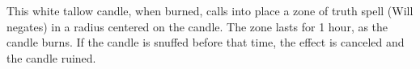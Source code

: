 {\begin{comment}
Faint abjuration; CL 1st; Craft Wondrous Item, shield; Price 1,500 gp.

Broom of Flying:} This broom is able to fly through the air as if affected by an overland flight spell (average maneuverability) for up to 9 hours per day (split up as its owner desires). The broom can carry 200 pounds and fly at a speed of 40 feet, or up to 400 pounds at a speed at 30 feet. In addition, the broom can travel alone to any destination named by the owner as long as she has a good idea of the location and layout of that destination. It comes to its owner from as far away as 300 yards when she speaks the command word. The broom of flying has a speed of 40 feet when it has no rider.

Moderate transmutation; CL 9th; Craft Wondrous Item, overland flight, permanency; Price 17,000 gp;Weight 3 lb.

Candle of Invocation:} Each of these special tapers is dedicated to one of the nine alignments. Simply burning the candle generates a favorable aura for the individual so doing if the candle's alignment matches that of the character. Characters of the same alignment as the burning candle add a \plus2 morale bonus on attack rolls, saving throws, and skill checks while within 30 feet of the flame.

A cleric whose alignment matches the candle's operates as if two levels higher for purposes of determining spells per day if he burns the candle during or just prior to his spell preparation time. He can even cast spells normally unavailable to him, as if he were of that higher level, but only so long as the candle continues to burn. Except in special cases (see below), a candle burns for 4 hours.

In addition, burning a candle also allows the owner to cast a gate spell, the respondent being of the same alignment as the candle, but the taper is immediately consumed in the process. It is possible to extinguish the candle simply by blowing it out, so users often place it in a lantern to protect it from drafts and the like. Doing this doesn't interfere with its magical properties.

Strong conjuration; CL 17th; Craft Wondrous Item, gate, creator must be same alignment as candle created; Price 8,400 gp;Weight 1/2 lb.
\end{comment}

 This white tallow candle, when burned, calls into place a zone of truth spell (Will negates) in a  radius centered on the candle. The zone lasts for 1 hour, as the candle burns. If the candle is snuffed before that time, the effect is canceled and the candle ruined.

}
